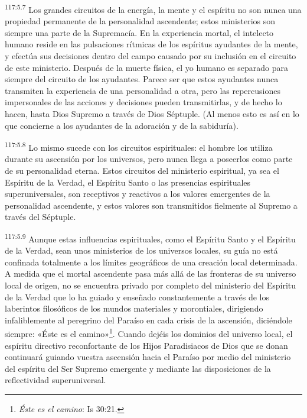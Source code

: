 \par
\textsuperscript{117:5.7} Los grandes circuitos de la energía, la mente y el espíritu no son nunca una propiedad permanente de la personalidad ascendente; estos ministerios son siempre una parte de la Supremacía. En la experiencia mortal, el intelecto humano reside en las pulsaciones rítmicas de los espíritus ayudantes de la mente, y efectúa sus decisiones dentro del campo causado por su inclusión en el circuito de este ministerio. Después de la muerte física, el yo humano es separado para siempre del circuito de los ayudantes. Parece ser que estos ayudantes nunca transmiten la experiencia de una personalidad a otra, pero las repercusiones impersonales de las acciones y decisiones pueden transmitirlas, y de hecho lo hacen, hasta Dios Supremo a través de Dios Séptuple. (Al menos esto es así en lo que concierne a los ayudantes de la adoración y de la sabiduría).

\par
\textsuperscript{117:5.8} Lo mismo sucede con los circuitos espirituales: el hombre los utiliza durante su ascensión por los universos, pero nunca llega a poseerlos como parte de su personalidad eterna. Estos circuitos del ministerio espiritual, ya sea el Espíritu de la Verdad, el Espíritu Santo o las presencias espirituales superuniversales, son receptivos y reactivos a los valores emergentes de la personalidad ascendente, y estos valores son transmitidos fielmente al Supremo a través del Séptuple.

\par
\textsuperscript{117:5.9} Aunque estas influencias espirituales, como el Espíritu Santo y el Espíritu de la Verdad, sean unos ministerios de los universos locales, su guía no está confinada totalmente a los límites geográficos de una creación local determinada. A medida que el mortal ascendente pasa más allá de las fronteras de su universo local de origen, no se encuentra privado por completo del ministerio del Espíritu de la Verdad que lo ha guiado y enseñado constantemente a través de los laberintos filosóficos de los mundos materiales y morontiales, dirigiendo infaliblemente al peregrino del Paraíso en cada crisis de la ascensión, diciéndole siempre: «Éste es el camino»\footnote{\textit{Éste es el camino}: Is 30:21.}. Cuando dejéis los dominios del universo local, el espíritu directivo reconfortante de los Hijos Paradisiacos de Dios que se donan continuará guiando vuestra ascensión hacia el Paraíso por medio del ministerio del espíritu del Ser Supremo emergente y mediante las disposiciones de la reflectividad superuniversal.

